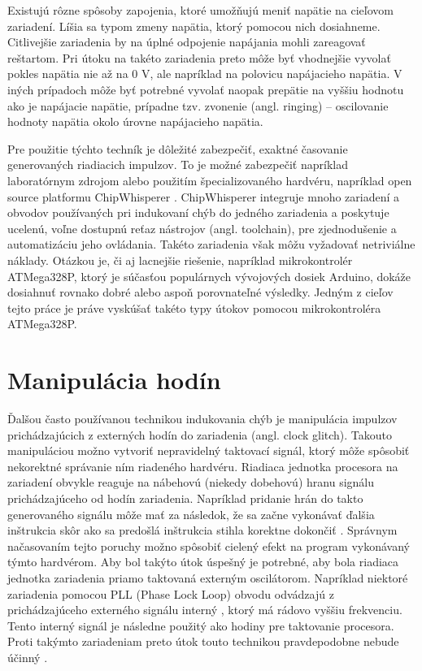 Existujú rôzne spôsoby zapojenia, ktoré umožňujú meniť napätie na cieľovom zariadení. Líšia sa typom zmeny napätia, ktorý pomocou nich dosiahneme. Citlivejšie zariadenia by na úplné odpojenie napájania mohli zareagovať reštartom. Pri útoku na takéto zariadenia preto môže byť vhodnejšie vyvolať pokles napätia nie až na 0 V, ale napríklad na polovicu napájacieho napätia. V iných prípadoch môže byť potrebné vyvolať naopak prepätie na vyššiu hodnotu ako je napájacie napätie, prípadne tzv. zvonenie (angl. ringing) -- oscilovanie hodnoty napätia okolo úrovne napájacieho napätia.

Pre použitie týchto techník je dôležité zabezpečiť, exaktné časovanie generovaných riadiacich impulzov. To je možné zabezpečiť napríklad laboratórnym zdrojom alebo použitím špecializovaného hardvéru, napríklad open source platformu ChipWhisperer \cite{chipwhisperer}. ChipWhisperer integruje mnoho zariadení a obvodov používaných pri indukovaní chýb do jedného zariadenia a poskytuje ucelenú, voľne dostupnú reťaz nástrojov (angl. toolchain), pre zjednodušenie a automatizáciu jeho ovládania. Takéto zariadenia však môžu vyžadovať netriviálne náklady. Otázkou je, či aj lacnejšie riešenie, napríklad mikrokontrolér ATMega328P, ktorý je súčasťou populárnych vývojových dosiek Arduino, dokáže dosiahnuť rovnako dobré alebo aspoň porovnateľné výsledky. Jedným z cieľov tejto práce je práve vyskúšať takéto typy útokov pomocou mikrokontroléra ATMega328P.

\section{Manipulácia hodín}
Ďalšou často používanou technikou indukovania chýb je manipulácia impulzov prichádzajúcich z externých hodín do zariadenia (angl. clock glitch). Takouto manipuláciou možno vytvoriť nepravidelný taktovací signál, ktorý môže spôsobiť nekorektné správanie ním riadeného hardvéru. Riadiaca jednotka procesora na zariadení obvykle reaguje na nábehovú (niekedy dobehovú) hranu signálu prichádzajúceho od hodín zariadenia. Napríklad pridanie hrán do takto generovaného signálu môže mať za následok, že sa začne vykonávať ďalšia inštrukcia skôr ako sa predošlá inštrukcia stihla korektne dokončiť \cite{clock}. Správnym načasovaním tejto poruchy možno spôsobiť cielený efekt na program vykonávaný týmto hardvérom. Aby bol takýto útok úspešný je potrebné, aby bola riadiaca jednotka zariadenia priamo taktovaná externým oscilátorom. Napríklad niektoré zariadenia pomocou PLL (Phase Lock Loop) obvodu odvádzajú z prichádzajúceho externého signálu interný \cite{stmReference}, ktorý má rádovo vyššiu frekvenciu. Tento interný signál je následne použitý ako hodiny pre taktovanie procesora. Proti takýmto zariadeniam preto útok touto technikou pravdepodobne nebude účinný \cite{crowbars}.

